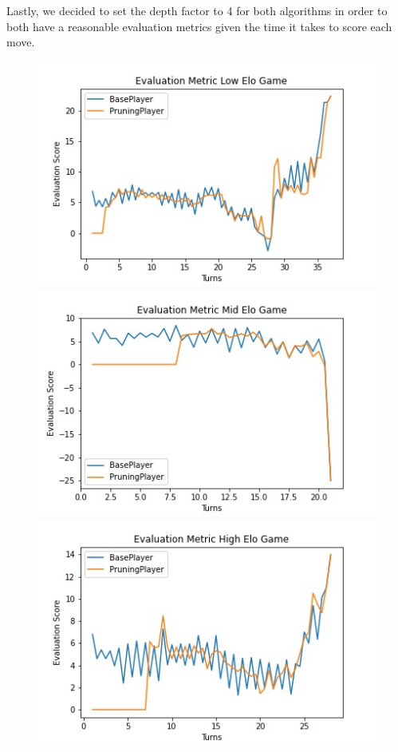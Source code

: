 \documentclass[letterpaper]{article}
\begin{document}
Lastly, we decided to set the depth factor to 4 for both algorithms in order to both have a reasonable evaluation metrics given the time it takes to score each move.

\begin{figure}
    \centering

    \includegraphics[scale= 0.38]{low_game_eval.jpg}
    \includegraphics[scale= 0.38]{mid_game_eval.jpg}
    \includegraphics[scale= 0.38]{high_game_eval.jpg}


\end{figure}
\end{document}
